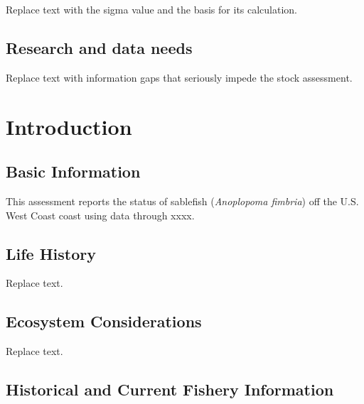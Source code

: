 \documentclass[11pt,
  letterpaper,
]{article}
\begin{document}
Replace text with the sigma value and the basis for its calculation.

\hypertarget{research-and-data-needs}{%
\subsection*{Research and data needs}\label{research-and-data-needs}}

Replace text with information gaps that seriously impede the stock assessment.

\pagebreak
\setlength{\parskip}{5mm plus1mm minus1mm}
\setcounter{page}{1}
\renewcommand{\thefigure}{\arabic{figure}}
\renewcommand{\thetable}{\arabic{table}}
\setcounter{table}{0}
\setcounter{figure}{0}

\hypertarget{introduction}{%
\section{Introduction}\label{introduction}}

\hypertarget{basic-information}{%
\subsection{Basic Information}\label{basic-information}}

This assessment reports the status of sablefish (\emph{Anoplopoma fimbria}) off the U.S. West Coast coast using data through xxxx.

\hypertarget{life-history}{%
\subsection{Life History}\label{life-history}}

Replace text.

\hypertarget{ecosystem-considerations-1}{%
\subsection{Ecosystem Considerations}\label{ecosystem-considerations-1}}

Replace text.

\hypertarget{historical-and-current-fishery-information}{%
\subsection{Historical and Current Fishery Information}\label{historical-and-current-fishery-information}}
\end{document}
